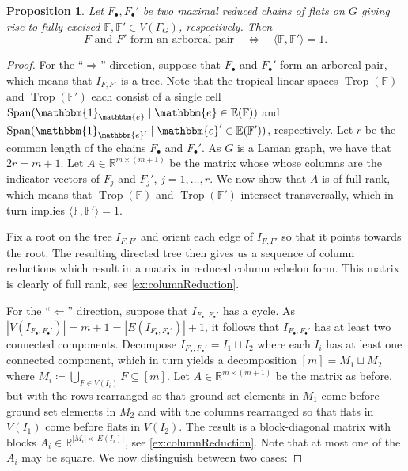 \documentclass[11pt,reqno,a4paper]{amsart}
\theoremstyle{theoremstyle}
\newtheorem{proposition}[theorem]{Proposition}
\theoremstyle{examplestyle}
\theoremstyle{algorithmstyle}
\newcommand{\EE}{\mathbb{E}}
\newcommand{\ee}{\mathbbm{e}}
\newcommand{\FF}{\mathbb{F}}
\newcommand{\RR}{\mathbb{R}}
\newcommand{\bbone}{\mathbbm{1}}
\DeclareMathOperator{\Span}{Span}
\DeclareMathOperator{\Trop}{Trop}
\begin{document}
\begin{proposition}
  \label{prop:arboreal}
  Let $F_\bullet, F_\bullet'$ be two maximal reduced chains of flats on $G$ giving rise to fully excised $\FF,\FF'\in V(\Gamma_G)$, respectively.  Then
  \begin{equation*}
    F \text{ and } F' \text{ form an arboreal pair}\quad\Longleftrightarrow\quad \langle\FF,\FF'\rangle=1.
  \end{equation*}
\end{proposition}
\begin{proof}
  For the ``$\Rightarrow$'' direction, suppose that $F_{\bullet}$ and $F_\bullet'$ form an arboreal pair, which means that $I_{F,F'}$ is a tree.
  Note that the tropical linear spaces $\Trop(\FF)$ and $\Trop(\FF')$ each consist of a single cell $\Span(\bbone_{\ee}\mid \ee\in\EE(\FF))$ and $\Span(\bbone_{\ee'}\mid \ee'\in\EE(\FF'))$, respectively.
  Let $r$ be the common length of the chains $F_{\bullet}$ and $F_\bullet'$.  As $G$ is a Laman graph, we have that $2r=m+1$.
  Let $A\in\RR^{m\times (m+1)}$ be the matrix whose whose columns are the indicator vectors of $F_j$ and $F_j'$, $j=1,\dots,r$.  We now show that $A$ is of full rank, which means that  $\Trop(\FF)$ and $\Trop(\FF')$ intersect transversally, which in turn implies $\langle\FF,\FF'\rangle=1$.

  Fix a root on the tree $I_{F,F'}$ and orient each edge of $I_{F,F'}$ so that it points towards the root. The resulting directed tree then gives us a sequence of column reductions which result in a matrix in reduced column echelon form. This matrix is clearly of full rank, see \cref{ex:columnReduction}.

  For the ``$\Leftarrow$'' direction, suppose that $I_{F_\bullet,F_\bullet'}$ has a cycle.  As $|V(I_{F_\bullet,F_\bullet'})|=m+1=|E(I_{F_\bullet,F_\bullet'})|+1$, it follows that $I_{F_\bullet,F_\bullet'}$ has at least two connected components.  Decompose $I_{F_\bullet,F_\bullet'}=I_1\sqcup I_2$ where each $I_i$ has at least one connected component, which in turn yields a decomposition $[m]=M_1\sqcup M_2$ where $M_i\coloneqq \bigcup_{F\in V(I_i)} F\subseteq [m]$.  Let $A\in\RR^{m\times (m+1)}$ be the matrix as before, but with the rows rearranged so that ground set elements in $M_1$ come before ground set elements in $M_2$ and with the columns rearranged so that flats in $V(I_1)$ come before flats in $V(I_2)$.  The result is a block-diagonal matrix with blocks $A_i\in\RR^{|M_i|\times|E(I_i)|}$, see \cref{ex:columnReduction}.  Note that at most one of the $A_i$ may be square. We now distinguish between two cases:


\end{proof}
\end{document}
